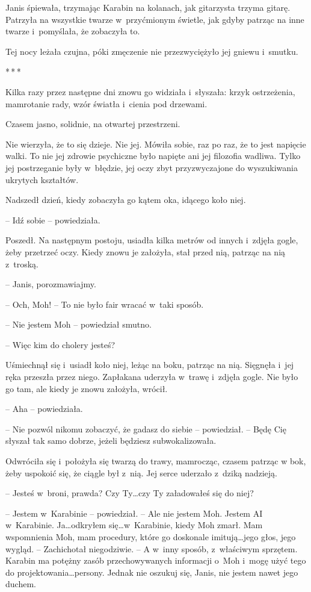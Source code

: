 \documentclass[oneside,polish,11pt,sfheadings]{mwbk}
\newcommand{\threeast}{\bigskip\par\centerline{*\,*\,*}\medskip\par}%
\begin{document}
Janis śpiewała, trzymając Karabin na kolanach, jak gitarzysta trzyma
gitarę. Patrzyła na wszystkie twarze w~przyćmionym świetle, jak gdyby
patrząc na inne twarze i~pomyślała, że zobaczyła to.

Tej nocy leżała czujna, póki zmęczenie nie przezwyciężyło jej gniewu i~smutku.
  \threeast 

Kilka razy przez następne dni znowu go widziała i~słyszała: krzyk
ostrzeżenia, mamrotanie rady, wzór światła i~cienia pod drzewami.

Czasem jasno, solidnie, na otwartej przestrzeni.

Nie wierzyła, że to się dzieje. Nie jej. Mówiła sobie, raz po raz, że to
jest napięcie walki. To nie jej zdrowie psychiczne było napięte ani jej
filozofia wadliwa. Tylko jej postrzeganie były w~błędzie, jej oczy zbyt
przyzwyczajone do wyszukiwania ukrytych kształtów.

Nadszedł dzień, kiedy zobaczyła go kątem oka, idącego koło niej.

-- Idź sobie -- powiedziała.

Poszedł. Na następnym postoju, usiadła kilka metrów od innych i~zdjęła
gogle, żeby przetrzeć oczy. Kiedy znowu je założyła, stał przed nią,
patrząc na nią z~troską.

-- Janis, porozmawiajmy.

-- Och, Moh! -- To nie było fair wracać w~taki sposób.

-- Nie jestem Moh -- powiedział smutno.

-- Więc kim do cholery jesteś?

Uśmiechnął się i~usiadł koło niej, leżąc na boku, patrząc na nią.
Sięgnęła i~jej ręka przeszła przez niego. Zapłakana uderzyła w~trawę i~zdjęła gogle. Nie było go tam, ale kiedy je znowu założyła, wrócił.

-- Aha -- powiedziała.

-- Nie pozwól nikomu zobaczyć, że gadasz do siebie -- powiedział. -- Będę
Cię słyszał tak samo dobrze, jeżeli będziesz subwokalizowała.

Odwróciła się i~położyła się twarzą do trawy, mamrocząc, czasem patrząc
w bok, żeby uspokoić się, że ciągle był z~nią. Jej serce uderzało z~dziką nadzieją.

-- Jesteś w~broni, prawda? Czy Ty\ldots czy Ty załadowałeś się do niej?

-- Jestem w~Karabinie -- powiedział. -- Ale nie jestem Moh. Jestem AI w~Karabinie. Ja\ldots odkryłem się\ldots w~Karabinie, kiedy Moh zmarł. Mam
wspomnienia Moh, mam procedury, które go doskonale imitują\ldots jego głos,
jego wygląd. -- Zachichotał niegodziwie. -- A w~inny sposób, z~właściwym
sprzętem. Karabin ma potężny zasób przechowywanych informacji o~Moh i~mogę użyć tego do projektowania\ldots persony. Jednak nie oszukuj się,
Janis, nie jestem nawet jego duchem.
\end{document}
